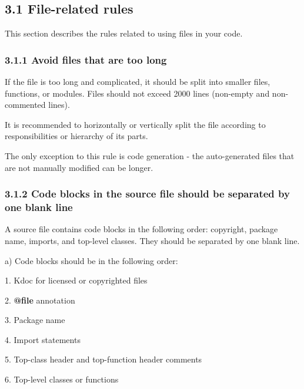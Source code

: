 {{{{{{{{{{{{{{{{\label{sec:3.}

\subsection*{\textbf{3.1 File-related rules}}

\label{sec:3.1}

This section describes the rules related to using files in your code.

\subsubsection*{\textbf{3.1.1 Avoid files that are too long}}
\leavevmode\newline

\label{sec:3.1.1}



If the file is too long and complicated, it should be split into smaller files, functions, or modules. Files should not exceed 2000 lines (non-empty and non-commented lines).

It is recommended to horizontally or vertically split the file according to responsibilities or hierarchy of its parts.

The only exception to this rule is code generation - the auto-generated files that are not manually modified can be longer.



\subsubsection*{\textbf{3.1.2 Code blocks in the source file should be separated by one blank line}}
\leavevmode\newline

\label{sec:3.1.2}

A source file contains code blocks in the following order: copyright, package name, imports, and top-level classes. They should be separated by one blank line.



a) Code blocks should be in the following order:

1.	Kdoc for licensed or copyrighted files

2.	\textbf{@file} annotation

3.	Package name

4.	Import statements

5.	Top-class header and top-function header comments

6.	Top-level classes or functions



}}}}}}}}}}}}}}}}
